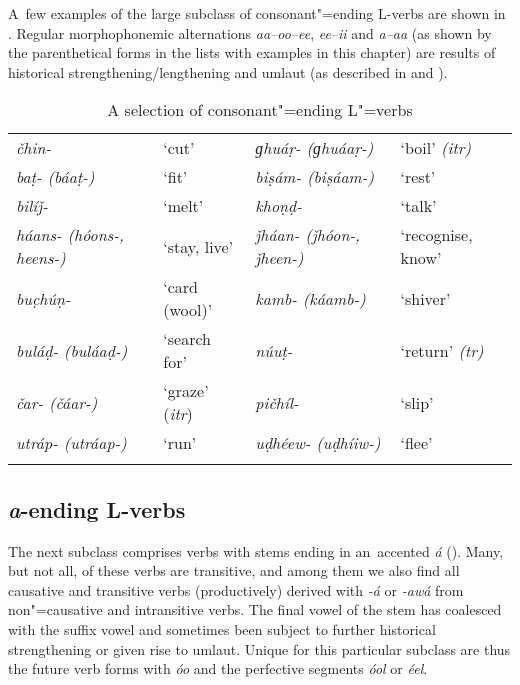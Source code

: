 \largerpage
A~few examples of the large subclass of consonant"=ending L-verbs are shown in . Regular morphophonemic alternations \textit{aa--oo--ee}, \textit{ee--ii} and \textit{a--aa} (as shown by the parenthetical forms in the lists with examples in this chapter) are results of historical strengthening/lengthening and umlaut (as described in  and ). 


\begin{table}[t]
\caption{A selection of consonant"=ending L"=verbs}
\begin{tabularx}{\textwidth}{ Q Q Q Q }
\lsptoprule
\textit{čhin-} &
`cut' &
\textit{ɡhuáṛ- (ɡhuáaṛ-)} &
`boil' \textit{(itr)}\\
\textit{baṭ- (báaṭ-)} &
`fit' &
\textit{biṣám- (biṣáam-)} &
`rest'\\
\textit{bilíǰ-} &
`melt' &
\textit{khoṇḍ-} &
`talk'\\
\textit{háans- (hóons-, heens-)} &
`stay, live'
&
\textit{ǰháan- (ǰhóon-, ǰheen-)} &
`recognise, know'\\
\textit{buc̣húṇ-} &
`card (wool)' &
\textit{kamb- (káamb-)} &
`shiver'\\
\textit{buláḍ- (buláaḍ-)} &
`search for' &
\textit{núuṭ-} &
`return' \textit{(tr)}\\
\textit{čar- (čáar-)} &
`graze' (\textit{itr}) &
\textit{pičhíl-} &
`slip'\\
\textit{utráp- (utráap-)} &
`run' &
\textit{uḍhéew- (uḍhíiw-)} &
`flee'\\\lspbottomrule
\end{tabularx}
\label{tab:8-lc}
\end{table}


\subsection{\textit{a}-ending L-verbs}
\label{subsec:8-3-2}

\largerpage[-1]
The next subclass comprises verbs with stems ending in an~accented \textit{á} (). Many, but not all, of these verbs are transitive, and among them we also find all causative and transitive verbs (productively) derived with \textit{-á} or \textit{-awá} from non"=causative and intransitive verbs. The final vowel of the stem has coalesced with the suffix vowel and sometimes been subject to further historical strengthening or given rise to umlaut. Unique for this particular subclass are thus the future verb forms with \textit{óo} and the perfective segments \textit{óol} or \textit{éel}. 


